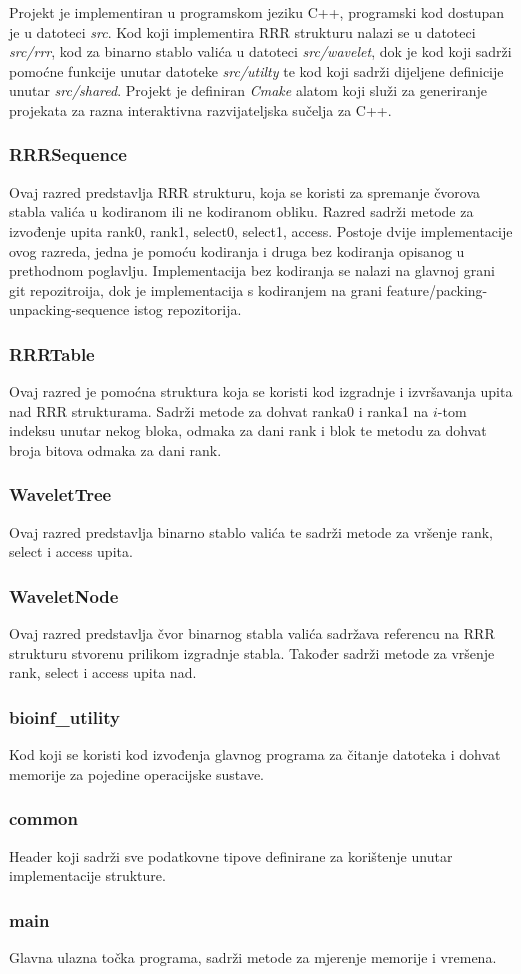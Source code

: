 Projekt je implementiran u programskom jeziku C++, programski kod dostupan je u datoteci \emph{src}. Kod koji implementira RRR strukturu nalazi se u datoteci \emph{src/rrr}, kod za binarno stablo valića u datoteci \emph{src/wavelet}, dok je kod koji sadrži pomoćne funkcije unutar datoteke \emph{src/utilty} te kod koji sadrži dijeljene definicije unutar \emph{src/shared}. Projekt je definiran \emph{Cmake} alatom koji služi za generiranje projekata za razna interaktivna razvijateljska sučelja za C++.

\subsubsection{RRRSequence}
Ovaj razred predstavlja RRR strukturu, koja se koristi za spremanje čvorova stabla valića u kodiranom ili ne kodiranom obliku. Razred sadrži metode za izvođenje upita rank0, rank1, select0, select1, access. Postoje dvije implementacije ovog razreda, jedna je pomoću kodiranja i druga bez kodiranja opisanog u prethodnom poglavlju. Implementacija bez kodiranja se nalazi na glavnoj grani git repozitroija, dok je implementacija s kodiranjem na grani feature/packing-unpacking-sequence istog repozitorija.

\subsubsection{RRRTable}
Ovaj razred je pomoćna struktura koja se koristi kod izgradnje i izvršavanja upita nad RRR strukturama. Sadrži metode za dohvat ranka0 i ranka1 na $i$-tom indeksu unutar nekog bloka, odmaka za dani rank i blok te metodu za dohvat broja bitova odmaka za dani rank.

\subsubsection{WaveletTree}
Ovaj razred predstavlja binarno stablo valića te sadrži metode za vršenje rank, select i access upita.

\subsubsection{WaveletNode}
Ovaj razred predstavlja čvor binarnog stabla valića  sadržava referencu na RRR strukturu stvorenu prilikom izgradnje stabla. Također sadrži metode za vršenje rank, select i access upita nad.

\subsubsection{bioinf\_utility}
Kod koji se koristi kod izvođenja glavnog programa za čitanje datoteka i dohvat memorije za pojedine operacijske sustave.

\subsubsection{common}
Header koji sadrži sve podatkovne tipove definirane za korištenje unutar implementacije strukture.

\subsubsection{main}
Glavna ulazna točka programa, sadrži metode za mjerenje memorije i vremena.